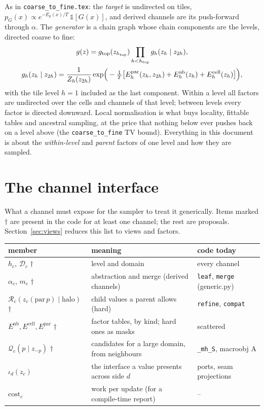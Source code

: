 \documentclass[11pt]{article}
\newcommand{\1}{\mathds{1}}
\newcommand{\Dom}{\mathcal{D}}
\newcommand{\Cand}{\mathcal{Q}}
\newcommand{\refine}{\mathcal{R}}
\begin{document}
As in \texttt{coarse\_to\_fine.tex}: the \emph{target} is undirected on tiles,
$p_G(x) \propto e^{-E_p(x)/T}\,\1[G(x)]$, and derived channels are its
push-forward through $\alpha$. The \emph{generator} is a chain graph whose chain
components are the levels, directed coarse to fine:
\begin{gather}
  g(z) = g_{\text{top}}(z_{h_{\text{top}}})\prod_{h < h_{\text{top}}} g_h(z_h \mid z_{2h}), \notag \\
  g_h(z_h \mid z_{2h}) = \frac{1}{Z_h(z_{2h})}
  \exp\!\Big(-\tfrac{1}{T}\big[E^{\mathrm{par}}_h(z_h, z_{2h}) + E^{\mathrm{nb}}_h(z_h) + E^{\mathrm{cell}}_h(z_h)\big]\Big),
  \label{eq:level}
\end{gather}
with the tile level $h = 1$ included as the last component. Within a level all
factors are undirected over the cells and channels of that level; between levels
every factor is directed downward. Local normalisation is what buys locality,
fittable tables and ancestral sampling, at the price that nothing below ever
pushes back on a level above (the \texttt{coarse\_to\_fine} $\mathrm{TV}$ bound).
Everything in this document is about the \emph{within-level} and
\emph{parent} factors of one level and how they are sampled.

\section{The channel interface}
\label{sec:interface}

What a channel must expose for the sampler to treat it generically. Items marked
$\dagger$ are present in the code for at least one channel; the rest are
proposals. Section~\ref{sec:views} reduces this list to views and factors.

\begin{center}
\small
\begin{tabular}{@{}lll@{}}
\toprule
member & meaning & code today \\
\midrule
$h_c$, $\Dom_c$ $\dagger$ & level and domain & every channel \\
$\alpha_c$, $m_c$ $\dagger$ & abstraction and merge (derived channels) & \texttt{leaf}, \texttt{merge} (generic.py) \\
$\refine_c(z_c(\mathrm{par}\,p) \mid \text{halo})$ $\dagger$ & child values a parent allows (hard) & \texttt{refine}, \texttt{compat} \\
$E^{\mathrm{nb}}, E^{\mathrm{cell}}, E^{\mathrm{par}}$ $\dagger$ & factor tables, by kind; hard ones as masks & scattered \\
$\Cand_c(p \mid z_{-p})$ $\dagger$ & candidates for a large domain, from neighbours & \texttt{\_mh\_S}, macroobj A \\
$\iota_d(z_c)$ & the interface a value presents across side $d$ & ports, seam projections \\
$\mathrm{cost}_c$ & work per update (for a compile-time report) & -- \\
\bottomrule
\end{tabular}
\end{center}
\end{document}
